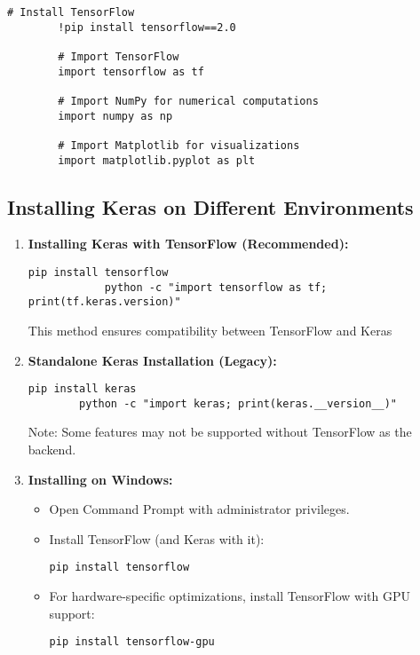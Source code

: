 	\begin{lstlisting}[caption={Example command to check Python version}, label={code:python-version}, style=pythonstyle]
		# Install TensorFlow
		!pip install tensorflow==2.0
		
		# Import TensorFlow
		import tensorflow as tf
		
		# Import NumPy for numerical computations
		import numpy as np
		
		# Import Matplotlib for visualizations
		import matplotlib.pyplot as plt
	\end{lstlisting}
	
	\subsection*{Installing Keras on Different Environments}
	\begin{enumerate}
		\item \textbf{Installing Keras with TensorFlow (Recommended):}
		\begin{lstlisting}[caption={Installation of keras in tensor flow}, label={code:bash-version}, style=bashstyle]
			pip install tensorflow
			python -c "import tensorflow as tf; print(tf.keras.version)"
		\end{lstlisting}
		This method ensures compatibility between TensorFlow and Keras
	\item \textbf{Standalone Keras Installation (Legacy):}
	\begin{lstlisting}[caption={installation of keras in Legacy version}, label={code:bash-version}, style=bashstyle]
		pip install keras
		python -c "import keras; print(keras.__version__)"
	\end{lstlisting}
	Note: Some features may not be supported without TensorFlow as the backend.
	
	\item \textbf{Installing on Windows:}
	\begin{itemize}
		\item Open Command Prompt with administrator privileges.
		\item Install TensorFlow (and Keras with it):
		\begin{lstlisting}[caption={Installation of keras on Windows}, label={code:bash-version}, style=bashstyle]
			pip install tensorflow
		\end{lstlisting}
		\item For hardware-specific optimizations, install TensorFlow with GPU support:
		\begin{lstlisting}[caption={Installation of Keras with GPU support}, label={code:bash-version}, style=bashstyle]
			pip install tensorflow-gpu
		\end{lstlisting}
	\end{itemize}
	

\end{enumerate}
